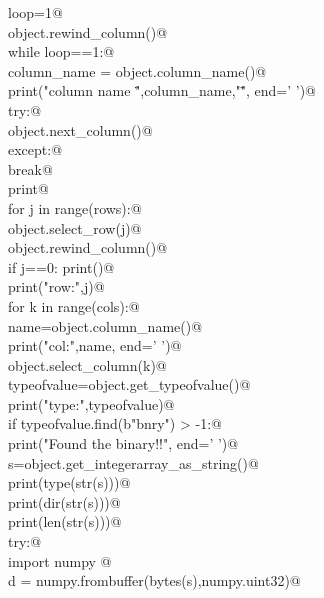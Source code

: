 \documentclass[10pt,a4paper,twoside,notitlepage]{article}
\begin{document}
\begin{flushleft}
\begin{minipage}{\linewidth}
\begin{list}{}{}
\mbox{}\verb@    loop=1@\\
\mbox{}\verb@    object.rewind_column()@\\
\mbox{}\verb@    while loop==1:@\\
\mbox{}\verb@        column_name = object.column_name()@\\
\mbox{}\verb@        print("column name \"",column_name,"\"", end=' ')@\\
\mbox{}\verb@        try:@\\
\mbox{}\verb@           object.next_column()@\\
\mbox{}\verb@        except:@\\
\mbox{}\verb@           break@\\
\mbox{}\verb@    print@\\
\mbox{}\verb@    for j in range(rows):@\\
\mbox{}\verb@        object.select_row(j)@\\
\mbox{}\verb@        object.rewind_column()@\\
\mbox{}\verb@        if j==0: print()@\\
\mbox{}\verb@        print("row:",j)@\\
\mbox{}\verb@        for k in range(cols):@\\
\mbox{}\verb@            name=object.column_name()@\\
\mbox{}\verb@            print("col:",name, end=' ')@\\
\mbox{}\verb@            object.select_column(k)@\\
\mbox{}\verb@            typeofvalue=object.get_typeofvalue()@\\
\mbox{}\verb@            print("type:",typeofvalue)@\\
\mbox{}\verb@            if typeofvalue.find(b"bnry") > -1:@\\
\mbox{}\verb@                print("Found the binary!!", end=' ')@\\
\mbox{}\verb@                s=object.get_integerarray_as_string()@\\
\mbox{}\verb@                print(type(str(s)))@\\
\mbox{}\verb@                print(dir(str(s)))@\\
\mbox{}\verb@                print(len(str(s)))@\\
\mbox{}\verb@                try:@\\
\mbox{}\verb@                   import numpy @\\
\mbox{}\verb@                   d = numpy.frombuffer(bytes(s),numpy.uint32)@\\

\end{list}
\end{minipage}
\end{flushleft}
\end{document}
